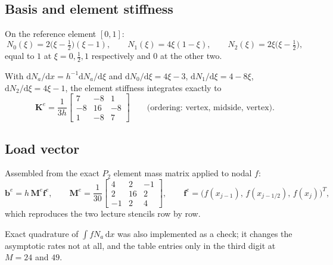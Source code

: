 \documentclass[11pt]{article}
\newcommand{\dx}{\,\mathrm{d}x}
\begin{document}
\subsection*{Basis and element stiffness }

\begin{steps}
\item On the reference element $[0,1]$:
\begin{equation}\label{eq:p6shape}
  N_0(\xi)=2\bigl(\xi-\tfrac12\bigr)(\xi-1),\qquad
  N_1(\xi)=4\xi(1-\xi),\qquad
  N_2(\xi)=2\xi\bigl(\xi-\tfrac12\bigr),
\end{equation}
      equal to $1$ at $\xi=0,\tfrac12,1$ respectively and $0$ at the other two.
\item With $\mathrm{d}N_a/\mathrm{d}x=h^{-1}\mathrm{d}N_a/\mathrm{d}\xi$ and
      $\mathrm{d}N_0/\mathrm{d}\xi=4\xi-3$, $\mathrm{d}N_1/\mathrm{d}\xi=4-8\xi$,
      $\mathrm{d}N_2/\mathrm{d}\xi=4\xi-1$, the element stiffness integrates
      exactly to
\begin{equation}\label{eq:p6Ke}
  \bm{K}^{e}=\frac{1}{3h}
  \begin{bmatrix} 7&-8&1\\ -8&16&-8\\ 1&-8&7\end{bmatrix}
  \qquad\text{(ordering: vertex, midside, vertex).}
\end{equation}
\end{steps}

\subsection*{Load vector  }

\begin{steps}
\item Assembled from the exact $P_2$ element mass matrix applied to nodal $f$:
\begin{equation}\label{eq:p6load}
  \bm{b}^{e}=h\,\bm{M}^{e}\bm{f}^{e},
  \qquad
  \bm{M}^{e}=\frac{1}{30}
  \begin{bmatrix}4&2&-1\\ 2&16&2\\ -1&2&4\end{bmatrix},
  \qquad
  \bm{f}^{e}=\bigl(f(x_{j-1}),\,f(x_{j-1/2}),\,f(x_j)\bigr)^{T},
\end{equation}
      which reproduces the two lecture stencils row by row.
\item Exact quadrature of $\int f N_a\dx$ was also implemented as a check; it
      changes the asymptotic rates not at all, and the table entries only in the
      third digit at $M=24$ and $49$.
\end{steps}
\end{document}
